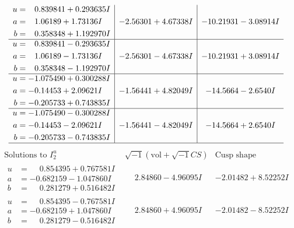 \documentclass[1p]{elsarticle_modified}
\theoremstyle{definition}
\newcommand{\I}{\sqrt{-1}}
\begin{document}
$$\begin{array}{c|c|c}
\begin{aligned}
u &= \phantom{-}0.839841 + 0.293635 I \\
a &= \phantom{-}1.06189 + 1.73136 I \\
b &= \phantom{-}0.358348 + 1.192970 I\end{aligned}
 & -2.56301 + 4.67338 I & -10.21931 - 3.08914 I \\ \hline\begin{aligned}
u &= \phantom{-}0.839841 - 0.293635 I \\
a &= \phantom{-}1.06189 - 1.73136 I \\
b &= \phantom{-}0.358348 - 1.192970 I\end{aligned}
 & -2.56301 - 4.67338 I & -10.21931 + 3.08914 I \\ \hline\begin{aligned}
u &= -1.075490 + 0.300288 I \\
a &= -0.14453 + 2.09621 I \\
b &= -0.205733 + 0.743835 I\end{aligned}
 & -1.56441 + 4.82049 I & -14.5664 - 2.6540 I \\ \hline\begin{aligned}
u &= -1.075490 - 0.300288 I \\
a &= -0.14453 - 2.09621 I \\
b &= -0.205733 - 0.743835 I\end{aligned}
 & -1.56441 - 4.82049 I & -14.5664 + 2.6540 I\\
 \hline 
 \end{array}$$\newpage$$\begin{array}{c|c|c}  
\text{Solutions to }I^u_{2}& \I (\text{vol} + \sqrt{-1}CS) & \text{Cusp shape}\\
 \hline 
\begin{aligned}
u &= \phantom{-}0.854395 + 0.767581 I \\
a &= -0.682159 - 1.047860 I \\
b &= \phantom{-}0.281279 + 0.516482 I\end{aligned}
 & \phantom{-}2.84860 - 4.96095 I & -2.01482 + 8.52252 I \\ \hline\begin{aligned}
u &= \phantom{-}0.854395 - 0.767581 I \\
a &= -0.682159 + 1.047860 I \\
b &= \phantom{-}0.281279 - 0.516482 I\end{aligned}
 & \phantom{-}2.84860 + 4.96095 I & -2.01482 - 8.52252 I \\ \hline\begin{aligned}

\end{aligned}
\end{array}$$
\end{document}
